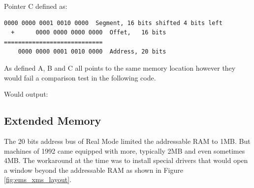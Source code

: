 \documentclass[book.tex]{subfiles}
\begin{document}
\bigskip

Pointer C defined as:
\begin{Verbatim}[fontsize=\relsize{-1}]
    0000 0000 0001 0010 0000  Segment, 16 bits shifted 4 bits left  
  +      0000 0000 0000 0000  Offet,   16 bits
============================
    0000 0000 0001 0010 0000  Address, 20 bits
\end{Verbatim}

As defined A, B and C all points to the same memory location however they would fail a comparison test in the following code.\\

\begin{minipage}{\textwidth}

\end{minipage}
Would output:

\begin{minipage}{\textwidth}

\end{minipage}
\par





  \subsection{Extended Memory}

The 20 bits address bus of Real Mode limited the addressable RAM to 1MB. But machines of 1992 came equipped with more, typically 2MB and even sometimes 4MB. The workaround at the time was to install special drivers that would open a window beyond the addressable RAM as shown in Figure \ref{fig:ems_xms_layout}.
\end{document}

